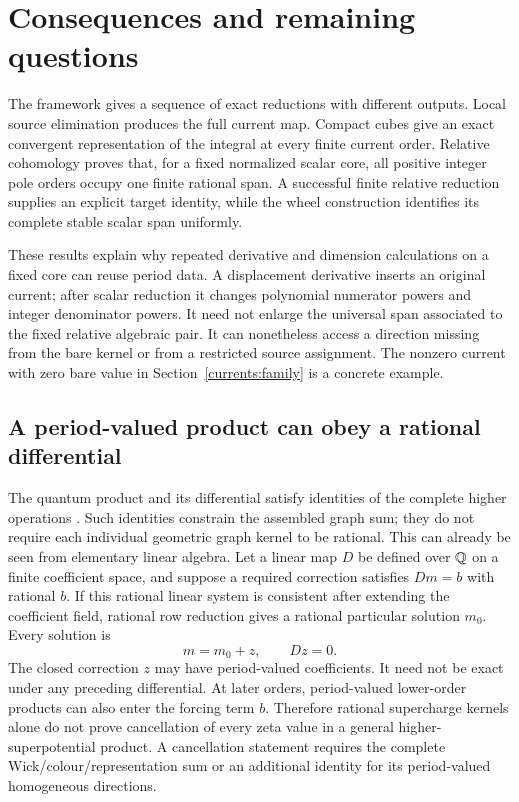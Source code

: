 \section{Consequences and remaining questions}
\label{discussion:scope}

The framework gives a sequence of exact reductions with different
outputs. Local source elimination produces the full current map.
Compact cubes give an exact convergent representation of the
integral at every finite current order. Relative cohomology proves
that, for a fixed normalized scalar core, all positive integer
pole orders occupy one finite rational span. A successful finite
relative reduction supplies an explicit target identity, while
the wheel construction identifies its complete stable scalar
span uniformly.

These results explain why repeated derivative and dimension
calculations on a fixed core can reuse period data. A displacement
derivative inserts an original current; after scalar reduction it
changes polynomial numerator powers and integer denominator
powers. It need not enlarge the universal span associated to the
fixed relative algebraic pair. It can nonetheless access a
direction missing from the bare kernel or from a restricted
source assignment. The nonzero current with zero bare value in
Section~\ref{currents:family} is a concrete example.

\subsection{A period-valued product can obey a rational differential}

The quantum product and its differential satisfy identities of
the complete higher operations \cite{gaiotto2024,li2026}.
Such identities constrain the assembled graph sum; they do not
require each individual geometric graph kernel to be rational.
This can already be seen from elementary linear algebra. Let a
linear map $D$ be defined over $\mathbb{Q}$ on a finite coefficient space,
and suppose a required correction satisfies $D m=b$ with rational
$b$. If this rational linear system is consistent after extending
the coefficient field, rational row reduction gives a rational
particular solution $m_0$. Every solution is
\begin{equation}
 m=m_0+z,\qquad D z=0.
 \label{discussion:homogeneous}
\end{equation}
The closed correction $z$ may have period-valued coefficients.
It need not be exact under any preceding differential. At later
orders, period-valued lower-order products can also enter the
forcing term $b$. Therefore rational supercharge kernels alone
do not prove cancellation of every zeta value in a general
higher-superpotential product. A cancellation statement requires
the complete Wick/colour/representation sum or an additional
identity for its period-valued homogeneous directions.

